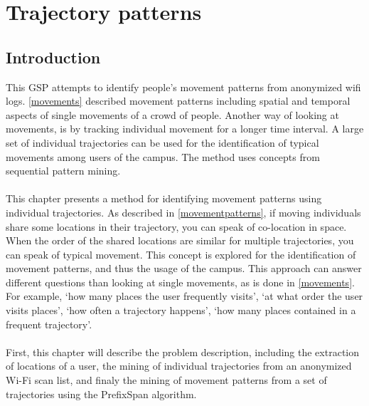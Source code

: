 \chapter{Trajectory patterns}\label{trajectories}
\section{Introduction}
This GSP attempts to identify people’s movement patterns from anonymized wifi logs. \autoref{movements} described movement patterns including spatial and temporal aspects of single movements of a crowd of people. Another way of looking at movements, is by tracking individual movement for a longer time interval. A large set of individual trajectories can be used for the identification of typical movements among users of the campus. The method uses concepts from sequential pattern mining. \\\\
This chapter presents a method for identifying movement patterns using individual trajectories. As described in \autoref{movementpatterns}, if moving individuals share some locations in their trajectory, you can speak of co-location in space. When the order of the shared locations are similar for multiple trajectories, you can speak of typical movement. This concept is explored for the identification of movement patterns, and thus the usage of the campus. This approach can answer different questions than looking at single movements, as is done in \autoref{movements}. For example, ‘how many places the user frequently visits’, ‘at what order the user visits places’, ‘how often a trajectory happens’, ‘how many places contained in a frequent trajectory’.\\\\
First, this chapter will describe the problem description, including the extraction of locations of a user, the mining of individual trajectories from an anonymized Wi-Fi scan list, and finaly the mining of movement patterns from a set of trajectories using the PrefixSpan algorithm.
